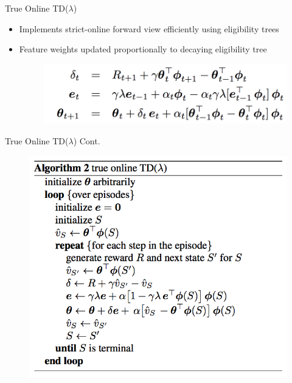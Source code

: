 \documentclass[xcolor={table}]{beamer}
\begin{document}
\begin{frame}{True Online TD($\lambda$)}
    \begin{itemize}
        \item Implements strict-online forward view efficiently using eligibility trees
        \item Feature weights updated proportionally to decaying eligibility tree
        \begin{figure}
            \centering
            \includegraphics[scale = 0.7]{equation.png}
            \label{fig:my_label}
        \end{figure}
    \end{itemize}
\end{frame}

\begin{frame}{True Online TD($\lambda$) Cont.}
    \begin{figure}
        \centering
        \includegraphics[scale = 0.41]{trueonline.png}
        \label{fig:my_label}
    \end{figure}
\end{frame}
\end{document}
